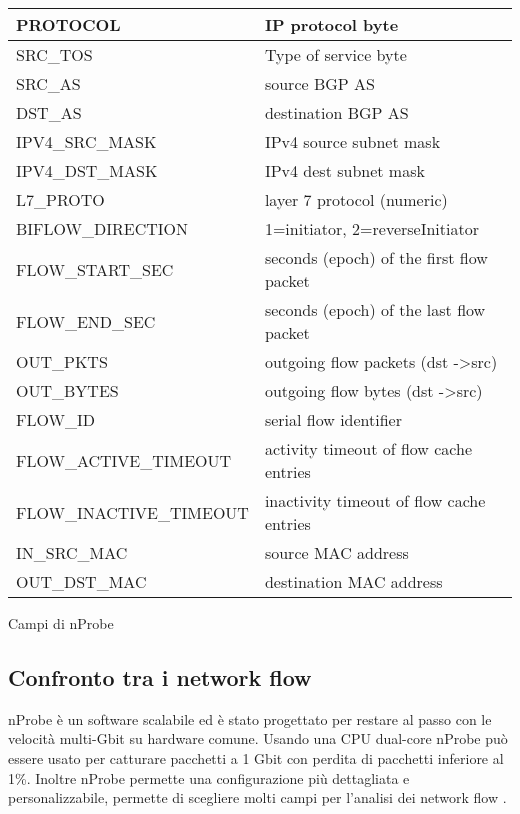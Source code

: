 \documentclass[../main.tex]{subfiles}
\begin{document}
\begin{table}[H]
\begin{tabular}{|l|l|}
PROTOCOL                             & IP protocol byte                              \\ \hline
SRC\_TOS                             & Type of service byte                          \\ \hline
SRC\_AS                              & source BGP AS                                 \\ \hline
DST\_AS                              & destination BGP AS                            \\ \hline
IPV4\_SRC\_MASK                      & IPv4 source subnet mask                       \\ \hline
IPV4\_DST\_MASK                      & IPv4 dest subnet mask                         \\ \hline
L7\_PROTO                            & layer 7 protocol (numeric)                    \\ \hline
BIFLOW\_DIRECTION                    & 1=initiator, 2=reverseInitiator               \\ \hline
FLOW\_START\_SEC                     & seconds (epoch) of the first flow packet      \\ \hline
FLOW\_END\_SEC                       & seconds (epoch) of the last flow packet       \\ \hline
OUT\_PKTS                            & outgoing flow packets (dst -\textgreater src) \\ \hline
OUT\_BYTES                           & outgoing flow bytes (dst -\textgreater src)   \\ \hline
FLOW\_ID                             & serial flow identifier                        \\ \hline
FLOW\_ACTIVE\_TIMEOUT                & activity timeout of flow cache entries        \\ \hline
FLOW\_INACTIVE\_TIMEOUT              & inactivity timeout of flow cache entries      \\ \hline
IN\_SRC\_MAC                         & source MAC address                            \\ \hline
OUT\_DST\_MAC                        & destination MAC address                       \\ \hline
\end{tabular}\par
\bigskip
Campi di nProbe
\end{table}

\subsection{Confronto tra i network flow}
nProbe è un software scalabile ed è stato progettato per restare al passo con le velocità multi-Gbit su hardware comune. Usando una CPU dual-core nProbe può essere usato per catturare pacchetti a 1 Gbit con perdita di pacchetti inferiore al 1\%. Inoltre nProbe permette una configurazione più dettagliata e personalizzabile, permette di scegliere molti campi per l'analisi dei network flow \cite{nProbe}.
\end{document}
